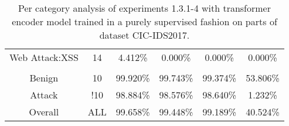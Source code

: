 \begin{table}[htb]
\begin{tabular}{@{}cccccc@{}}
        Web Attack:XSS &  14 &  4.412\% &  0.000\% &  0.000\% &  0.000\% \\
         \\
        Benign &  10 &  99.920\% &  99.743\% &  99.374\% &  53.806\% \\
        Attack &  !10 &  98.884\% &  98.576\% &  98.640\% &  1.232\% \\
        Overall &  ALL &  99.658\% &  99.448\% &  99.189\% &  40.524\% \\
        \bottomrule
    \end{tabular}
    \caption{Per category analysis of experiments 1.3.1-4 with transformer encoder model trained in a purely supervised fashion on parts of dataset CIC-IDS2017.}
    \label{table:results:lstm:class_flows_supervised}
\end{table}
